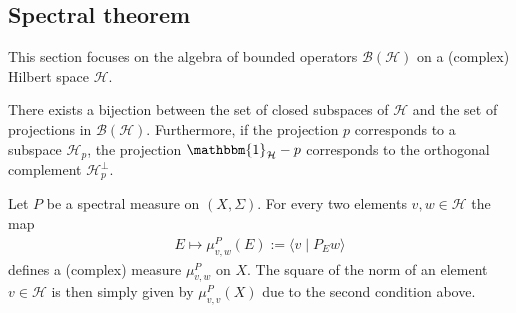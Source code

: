 \subsection{Spectral theorem}\label{section:PVM}

    This section focuses on the algebra of bounded operators $\mathcal{B}(\mathcal{H})$ on a (complex) Hilbert space $\mathcal{H}$.

    \begin{property}
        There exists a bijection between the set of closed subspaces of $\mathcal{H}$ and the set of projections in $\mathcal{B}(\mathcal{H})$. Furthermore, if the projection $p$ corresponds to a subspace $\mathcal{H}_p$, the projection $\mathbbm{1}_\mathcal{H}-p$ corresponds to the orthogonal complement $\mathcal{H}^\perp_p$.
    \end{property}

    \begin{property}
        Let $P$ be a spectral measure on $(X,\Sigma)$. For every two elements $v,w\in\mathcal{H}$ the map
        \begin{gather}
            E\mapsto\mu^P_{v,w}(E):=\langle v\mid P_Ew \rangle
        \end{gather}
        defines a (complex) measure $\mu^P_{v,w}$ on $X$. The square of the norm of an element $v\in\mathcal{H}$ is then simply given by $\mu^P_{v,v}(X)$ due to the second condition above.
    \end{property}

